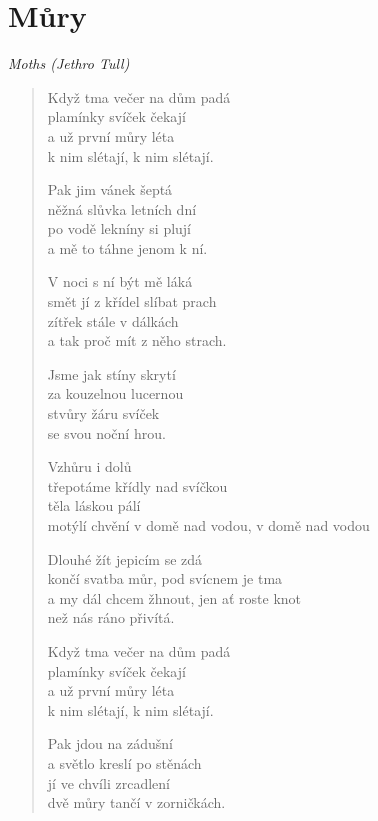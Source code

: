 \section*{Můry}

\textit{Moths (Jethro Tull)}

\begin{verse}
	
Když tma večer na dům padá \\
plamínky svíček čekají \\
a už první můry léta \\
k nim slétají, k nim slétají.

Pak jim vánek šeptá\\
něžná slůvka letních dní \\
po vodě lekníny si plují\\
a mě to táhne jenom k ní.

V noci s ní být mě láká \\
smět jí z křídel slíbat prach \\
zítřek stále v dálkách \\
a tak proč mít z něho strach.

Jsme jak stíny skrytí \\
za kouzelnou lucernou \\
stvůry žáru svíček \\
se svou noční hrou.

Vzhůru i dolů \\
třepotáme křídly nad svíčkou \\
těla láskou pálí \\
motýlí chvění v domě nad vodou, v domě nad vodou

Dlouhé žít jepicím se zdá \\
končí svatba můr, pod svícnem je tma \\
a my dál chcem žhnout, jen ať roste knot \\
než nás ráno přivítá.

Když tma večer na dům padá \\
plamínky svíček čekají \\
a už první můry léta \\
k nim slétají, k nim slétají.

Pak jdou na zádušní \\
a světlo kreslí po stěnách \\
jí ve chvíli zrcadlení \\
dvě můry tančí v zorničkách.
\end{verse}

